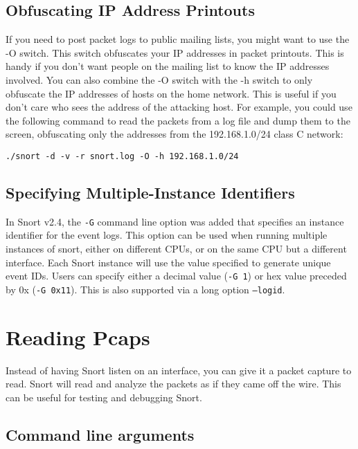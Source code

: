 \documentclass[english]{report}
\begin{document}
\subsection{Obfuscating IP Address Printouts}

If you need to post packet logs to public mailing lists, you might
want to use the -O switch. This switch obfuscates your IP addresses in
packet printouts. This is handy if you don't want people on the mailing
list to know the IP addresses involved. You can also combine the -O switch with
the -h switch to only obfuscate the IP addresses of hosts on the home network.
This is useful if you don't care who sees the address of the attacking host.
For example, you could use the following command to read the packets from a log 
file and dump them to the screen, obfuscating only the addresses from the 
192.168.1.0/24 class C network:
 
\begin{center}
\begin{verbatim}
./snort -d -v -r snort.log -O -h 192.168.1.0/24
\end{verbatim}
\end{center}

\subsection{Specifying Multiple-Instance Identifiers}

In Snort v2.4, the \texttt{-G} command line option was added that specifies
an instance identifier for the event logs.  This option can be used when
running multiple instances of snort, either on different CPUs, or on the same
CPU but a different interface.  Each Snort instance will use the value
specified to generate unique event IDs.  Users can specify either a
decimal value (\texttt{-G 1}) or hex value preceded by 0x (\texttt{-G 0x11}).
This is also supported via a long option \texttt{--logid}.

\section{Reading Pcaps}

Instead of having Snort listen on an interface, you can give it a packet 
capture to read.  Snort will read and analyze the packets as if they came
off the wire.  This can be useful for testing and debugging Snort.

\subsection{Command line arguments}
\end{document}
